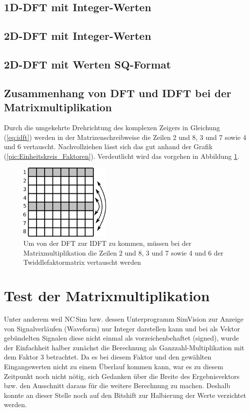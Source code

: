 \subsection{1D-DFT mit Integer-Werten}
 
\subsection{2D-DFT mit Integer-Werten}

\subsection{2D-DFT mit Werten SQ-Format}

\subsection{Zusammenhang von DFT und IDFT bei der Matrixmultiplikation}

Durch die umgekehrte Drehrichtung des komplexen Zeigers in Gleichung (\ref{eq:idft}) werden in der Matrizenschreibweise die Zeilen 2 und 8, 3 und 7 sowie 4 und 6 vertauscht.
Nachvollziehen lässt sich das gut anhand der Grafik (\ref{pic:Einheitskreis_Faktoren}). 
Verdeutlicht wird das vorgehen in Abbildung \ref{pic:IDFT_Zeilentausch}.

\begin{figure}[ht]
 \centering
 \includegraphics[width=0.4\textwidth]{img/IDFT_Zeilentausch.png}
 \caption{Um von der DFT zur IDFT zu kommen, müssen bei der Matrixmultiplikation die Zeilen 2 und 8, 3 und 7 sowie 4 und 6 der Twiddlefaktormatrix vertauscht werden}
 \label{pic:IDFT_Zeilentausch}
\end{figure}



\section{Test der Matrixmultiplikation}
Unter anderem weil NC\,Sim bzw. dessen Unterprogramm SimVision zur Anzeige von Signalverläufen (Waveform) nur Integer darstellen kann und bei als Vektor gebündelten Signalen 
diese nicht einmal als vorzeichenbehaftet (signed), wurde der Einfachheit halber zunächst die Berechnung als Ganzzahl-Multiplikation mit dem Faktor 3 betrachtet. 
Da es bei diesem Faktor und den gewählten Eingangswerten nicht zu einem 
Überlauf kommen kann, war es zu diesem Zeitpunkt noch nicht nötig, sich Gedanken über die Breite des Ergebnisvektors bzw. den Ausschnitt daraus für die weitere
Berechnung zu machen. Deshalb konnte an dieser Stelle noch auf den Bitshift zur Halbierung der Werte verzichtet werden.

